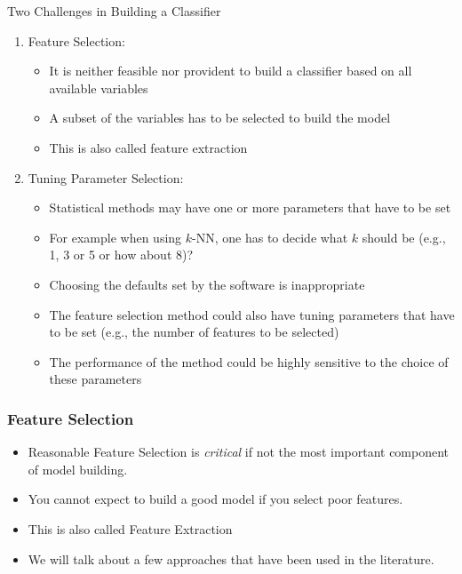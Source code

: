 \documentclass[xcolor=x11names,compress]{beamer}\usepackage[]{graphicx}\usepackage[]{color}
\begin{document}
\begin{frame}{Two Challenges in Building a Classifier}
  \begin{enumerate}
  \item Feature Selection:
    \begin{itemize}
    \item It is neither feasible nor provident to build a classifier based on all available
          variables
    \item A subset of the variables has to be selected to build the model
    \item This is also called feature extraction
    \end{itemize}
  \item Tuning Parameter Selection:
    \begin{itemize}
    \item Statistical methods may have one or more parameters that have to be set
    \item For example when using $k$-NN, one has to decide what $k$ should be (e.g., 1, 3 or 5 or how about 8)?
      \item Choosing the defaults set by the software is inappropriate  
    \item The feature selection method could also have tuning parameters that have to be set
          (e.g., the number of features to be selected)
    \item The performance of the method could be highly sensitive to the 
          choice of these parameters
    \end{itemize}
  \end{enumerate}
\end{frame}


\begin{frame}
  \frametitle{Feature Selection}
  \begin{itemize}
\item Reasonable Feature Selection is {\it critical} if not the most important
      component of model building.
\item You cannot expect to build a good model if you select poor features.      
\item This is also called Feature Extraction
\item We will talk about a few approaches that have been used in the literature.
\end{itemize}
\end{frame}
\end{document}
